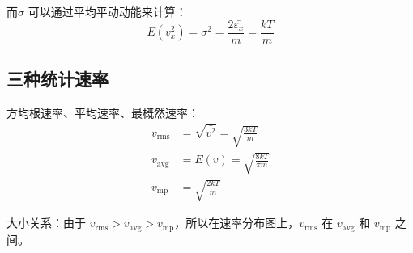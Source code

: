 \documentclass[10pt]{ctexart}
\begin{document}
而$\sigma$ 可以通过平均平动动能来计算：
$$
    E(v_x^2) =\sigma^2= \frac{2\bar{\varepsilon_x}}{m} = \frac{kT}{m}
$$

\subsection{三种统计速率}

方均根速率、平均速率、最概然速率：
\begin{align*}
    v_{\text{rms}} &= \sqrt{\bar{v^2}} = \sqrt{\frac{3kT}{m}} \\
    v_{\text{avg}} &= E(v) = \sqrt{\frac{8kT}{\pi m}} \\
    v_{\text{mp}} &= \sqrt{\frac{2kT}{m}}
\end{align*}


大小关系：由于 $v_{\text{rms}} > v_{\text{avg}} > v_{\text{mp}}$，所以在速率分布图上，$v_{\text{rms}}$ 在 $v_{\text{avg}}$ 和 $v_{\text{mp}}$ 之间。
\end{document}
